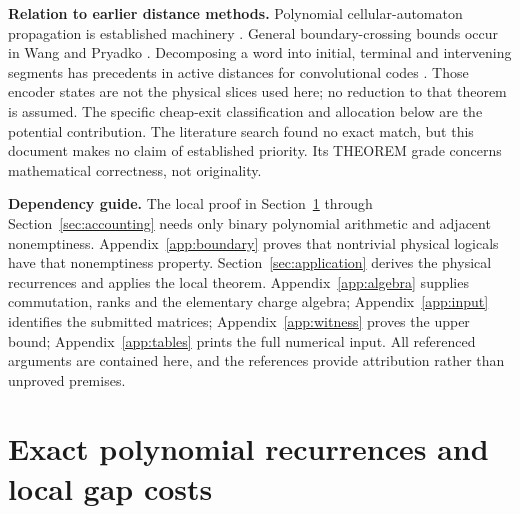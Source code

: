 \documentclass{article}
\begin{document}
\textbf{Relation to earlier distance methods.} Polynomial cellular-automaton
propagation is established machinery \cite[Section~2.1]{devakul2020}. General
boundary-crossing bounds occur in Wang and Pryadko
\cite[Statement~7 and Appendix~H]{wang2026}. Decomposing a word into initial,
terminal and intervening segments has precedents in active distances for
convolutional codes \cite[Section~III, Theorem~6]{host1999}. Those encoder states
are not the physical slices used here; no reduction to that theorem is
assumed. The specific cheap-exit classification and allocation below are
the potential contribution. The literature search found no exact match,
but this document makes no claim of established priority. Its THEOREM
grade concerns mathematical correctness, not originality.

\textbf{Dependency guide.} The local proof in Section~\ref{sec:local} through
Section~\ref{sec:accounting} needs only binary polynomial arithmetic and adjacent nonemptiness.
Appendix~\ref{app:boundary} proves that nontrivial physical logicals have that nonemptiness
property. Section~\ref{sec:application} derives the physical recurrences and applies the local
theorem. Appendix~\ref{app:algebra} supplies commutation, ranks and the elementary charge
algebra; Appendix~\ref{app:input} identifies the submitted matrices; Appendix~\ref{app:witness}
proves the upper bound; Appendix~\ref{app:tables} prints the full numerical input. All
referenced arguments are contained here, and the references provide attribution rather than
unproved premises.

\section{Exact polynomial recurrences and local gap costs}\label{sec:local}
\end{document}
